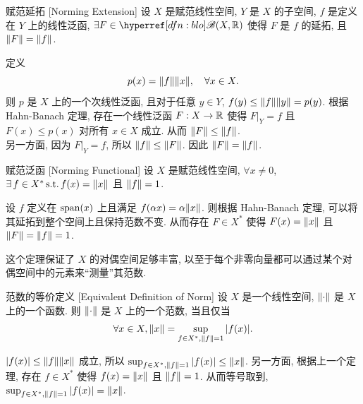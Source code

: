         \begin{thm}
            {赋范延拓}
            [Norming Extension]
            设 $X$ 是赋范线性空间, $Y$ 是 $X$ 的子空间, $f$ 是定义在 $Y$ 上的线性泛函, $\exists F \in \blo (X, \R)$ 使得 $F$ 是 $f$ 的延拓, 且 $\norm{F}=\norm{f}$.
        \end{thm}

        \begin{prf}
            定义
            \[p(x)=\norm{f}\norm{x}, \quad \forall x\in X.\]
            则 \(p\) 是 \(X\) 上的一个次线性泛函, 且对于任意 \(y\in Y\), \(f(y)\leq\norm{f}\norm{y}=p(y)\). 根据 Hahn-Banach 定理, 存在一个线性泛函 \(F:X\to\operatorname{\mathbb{R}}\) 使得 \(F|_Y=f\) 且 \(F(x)\leq p(x)\) 对所有 \(x\in X\) 成立. 从而 \(\norm{F}\leq\norm{f}\). \\
            另一方面, 因为 \(F|_Y=f\), 所以 \(\norm{f}\leq\norm{F}\). 因此 \(\norm{F}=\norm{f}\).
        \end{prf}

        \begin{thm}
            {赋范泛函}
            [Norming Functional]
            设 \(X\) 是赋范线性空间, \(\forall x\neq 0\), \(\exists\,f\in X^*\operatorname{\text{s.t.}} f(x)=\norm{x}\) 且 \(\norm{f}=1\).
        \end{thm}

        \begin{prf}
            设 \(f\) 定义在 \(\operatorname{span}(x)\) 上且满足 \(f(\alpha x)=\alpha\norm{x}\). 则根据 Hahn-Banach 定理, 可以将其延拓到整个空间上且保持范数不变. 从而存在 \(F\in X^*\) 使得 \(F(x)=\norm{x}\) 且 \(\norm{F}=\norm{f}=1\).
        \end{prf}

        \begin{rmk}
            [Dedicatia]
            这个定理保证了 $X$ 的对偶空间足够丰富, 以至于每个非零向量都可以通过某个对偶空间中的元素来“测量”其范数. 
        \end{rmk}

        \begin{crl}
            {范数的等价定义}
            [Equivalent Definition of Norm]
            设 \(X\) 是一个线性空间, \(\norm{\cdot}\) 是 \(X\) 上的一个函数. 则 \(\norm{\cdot}\) 是 \(X\) 上的一个范数, 当且仅当
            \[\forall x\in X, \norm{x}=\sup_{f\in X^*, \norm{f}=1} |f(x)|.\]
        \end{crl}

        \begin{prf}
            \(|f(x)|\leq\norm{f}\norm{x}\) 成立, 所以 \(\sup_{f\in X^*, \norm{f}=1} |f(x)|\leq\norm{x}\). 另一方面, 根据上一个定理, 存在 \(f\in X^*\) 使得 \(f(x)=\norm{x}\) 且 \(\norm{f}=1\). 从而等号取到, \(\sup_{f\in X^*, \norm{f}=1} |f(x)|=\norm{x}\).
        \end{prf}


